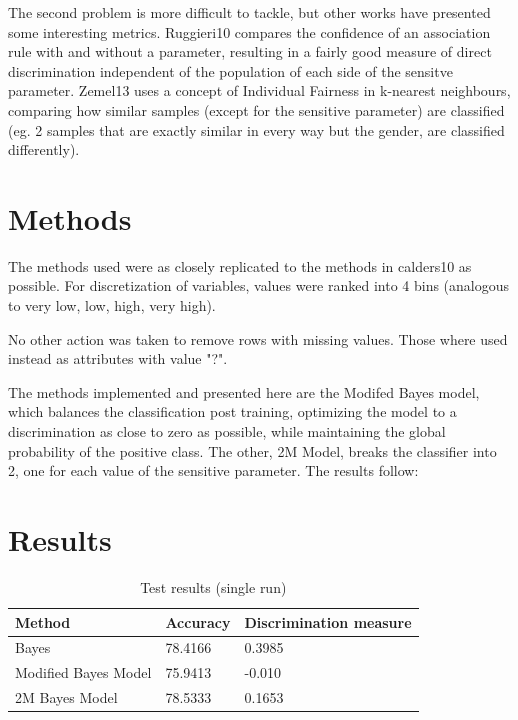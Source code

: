 \documentclass[paper=a4, fontsize=11pt]{scrartcl} %
\numberwithin{equation}{section} %
\numberwithin{figure}{section} %
\numberwithin{table}{section} %
\begin{document}
The second problem is more difficult to tackle, but other works have presented some interesting metrics. Ruggieri10 \cite{Ruggieri10} compares the confidence of an association rule with and without a parameter, resulting in a fairly good measure of direct discrimination independent of the population of each side of the sensitve parameter. Zemel13 \cite{Zemel13} uses a concept of Individual Fairness in k-nearest neighbours, comparing how similar samples (except for the sensitive parameter) are classified (eg. 2 samples that are exactly similar in every way but the gender, are classified differently).

\section{Methods}
The methods used were as closely replicated to the methods in calders10 \cite{calders10} as possible. For discretization of variables, values were ranked into 4 bins (analogous to very low, low, high, very high).

No other action was taken to remove rows with missing values. Those where used instead as attributes with value "?". 

The methods implemented and presented here are the Modifed Bayes model, which balances the classification post training, optimizing the model to a discrimination as close to zero as possible, while maintaining the global probability of the positive class. The other, 2M Model, breaks the classifier into 2, one for each value of the sensitive parameter. The results follow: 

\section{Results}
\begin{table}[hb]
\begin{center}
    \begin{tabular}{|l|l|l|}
    \hline
    \textbf{Method }                   & \textbf{Accuracy} & \textbf{Discrimination measure} \\ \hline
    Bayes                & 78.4166  & 0.3985                 \\ \hline
    Modified Bayes Model & 75.9413  & -0.010                 \\ \hline
    2M Bayes  Model      & 78.5333  & 0.1653                 \\ \hline
    \end{tabular}
    \caption {Test results (single run)}
    
\end{center}
\end{table}
\end{document}

